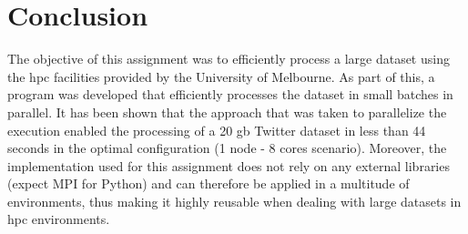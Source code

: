 \documentclass[paper=a4, fontsize=11pt]{scrartcl}
\numberwithin{equation}{section}		%
\numberwithin{figure}{section}			%
\numberwithin{table}{section}				%
\begin{document}
\section{Conclusion}
The objective of this assignment was to efficiently process a large dataset using the \acrshort{hpc} facilities provided by the University of Melbourne. As part of this, a program was developed that efficiently processes the dataset in small batches in parallel. It has been shown that the approach that was taken to parallelize the execution enabled the processing of a 20 \acrshort{gb} Twitter dataset in less than 44 seconds in the optimal configuration (1 node - 8 cores scenario).
\newline
Moreover, the implementation used for this assignment does not rely on any external libraries (expect MPI for Python) and can therefore be applied in a multitude of environments, thus making it highly reusable when dealing with large datasets in \acrshort{hpc} environments.

\printbibliography[heading=bibintoc]


\end{document}
